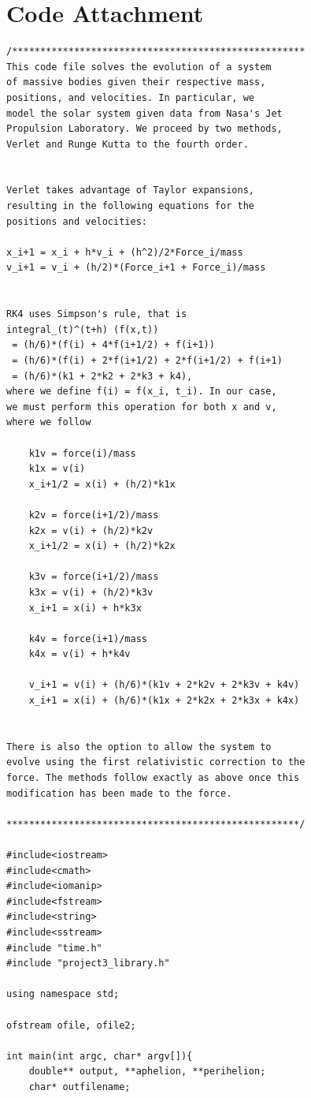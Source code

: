 \documentclass[11pt,a4paper]{article}
\begin{document}
\newpage

\section*{Code Attachment}

\begin{lstlisting}[title={project3.cpp}]
/****************************************************
This code file solves the evolution of a system 
of massive bodies given their respective mass, 
positions, and velocities. In particular, we 
model the solar system given data from Nasa's Jet
Propulsion Laboratory. We proceed by two methods, 
Verlet and Runge Kutta to the fourth order. 


Verlet takes advantage of Taylor expansions, 
resulting in the following equations for the
positions and velocities:

x_i+1 = x_i + h*v_i + (h^2)/2*Force_i/mass
v_i+1 = v_i + (h/2)*(Force_i+1 + Force_i)/mass


RK4 uses Simpson's rule, that is
integral_(t)^(t+h) (f(x,t)) 
 = (h/6)*(f(i) + 4*f(i+1/2) + f(i+1))
 = (h/6)*(f(i) + 2*f(i+1/2) + 2*f(i+1/2) + f(i+1)
 = (h/6)*(k1 + 2*k2 + 2*k3 + k4),
where we define f(i) = f(x_i, t_i). In our case, 
we must perform this operation for both x and v, 
where we follow
 
	k1v = force(i)/mass
	k1x = v(i)
	x_i+1/2 = x(i) + (h/2)*k1x

	k2v = force(i+1/2)/mass
	k2x = v(i) + (h/2)*k2v
	x_i+1/2 = x(i) + (h/2)*k2x

	k3v = force(i+1/2)/mass
	k3x = v(i) + (h/2)*k3v
	x_i+1 = x(i) + h*k3x

	k4v = force(i+1)/mass
	k4x = v(i) + h*k4v

	v_i+1 = v(i) + (h/6)*(k1v + 2*k2v + 2*k3v + k4v)
	x_i+1 = x(i) + (h/6)*(k1x + 2*k2x + 2*k3x + k4x)


There is also the option to allow the system to
evolve using the first relativistic correction to the
force. The methods follow exactly as above once this
modification has been made to the force.

****************************************************/

#include<iostream>
#include<cmath>
#include<iomanip>
#include<fstream>
#include<string>
#include<sstream>
#include "time.h"
#include "project3_library.h"

using namespace std;

ofstream ofile, ofile2;

int main(int argc, char* argv[]){
	double** output, **aphelion, **perihelion;
	char* outfilename;


\end{lstlisting}
\end{document}
